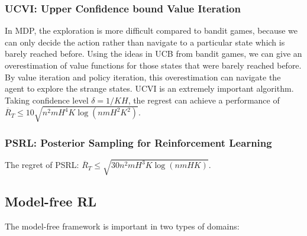 \documentclass[12pt]{report}
\begin{document}
\subsubsection{UCVI: Upper Confidence bound Value Iteration}
In MDP, the exploration is more difficult compared to bandit games, because we can only decide the action rather than navigate to a
particular state which is barely reached before. Using the ideas in UCB from bandit games, we can give an overestimation of value functions
for those states that were barely reached before. By value iteration and policy iteration, this overestimation can navigate the
agent to explore the strange states.
UCVI is an extremely important algorithm. Taking confidence level $\delta=1/KH$, the regrest can achieve a performance of $\overline{R}_T\leq10\sqrt{n^2mH^4K\log(nmH^2K^2)}.$

\subsubsection{PSRL: Posterior Sampling for Reinforcement Learning}
The regret of PSRL: $\overline{R}_T\leq\sqrt{30n^2mH^3K\log(nmHK)}.$

\subsection{Model-free RL}

The model-free framework is important in two types of domains:
\end{document}

